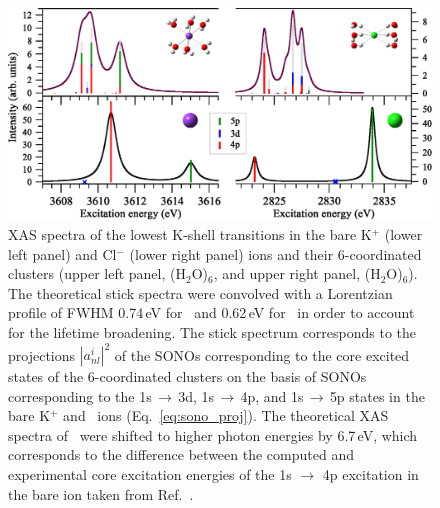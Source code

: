 \begin{figure}[h]
\centering
\includegraphics[scale=0.6]{figures/xas_spectra.eps}
\caption{
XAS spectra of the lowest K-shell transitions in the bare K$^{+}$ (lower left panel) and Cl$^{-}$ (lower right panel) ions and their 6-coordinated clusters (upper left panel, \ki(H$_2$O)$_6$, and upper right panel, \cli(H$_2$O)$_6$). The theoretical stick spectra were convolved with a Lorentzian profile of FWHM 0.74\,eV for \ki~and 0.62\,eV for \cli~in order to account for the lifetime broadening. The stick spectrum corresponds to the projections $|a_{nl}^{i}|^2$ of the SONOs corresponding to the core excited states of the 6-coordinated clusters on the basis of SONOs corresponding to the 1s$\,\rightarrow\,$3d, 1s$\,\rightarrow\,$4p, and 1s$\,\rightarrow\,$5p states in the bare K$^+$ and \cli~ions (Eq.\ \ref{eq:sono_proj}). The theoretical XAS spectra of \ki~were shifted to higher photon energies by 6.7\,eV, which corresponds to the difference between the computed and experimental core excitation energies of the 1s $\rightarrow$ 4p excitation in the bare ion taken from Ref.\ \citep{hertlein06:062715}.}
\label{fg:xas_kcl}
\end{figure}


